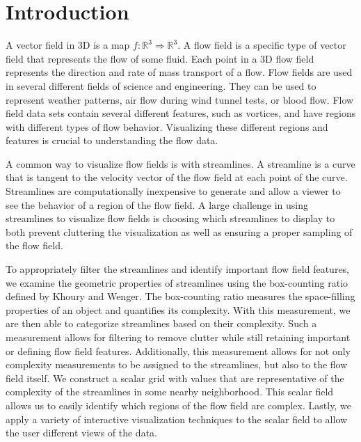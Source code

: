\documentclass{egpubl}
\newcommand {\emath}[1]  {\ensuremath{#1}}
\newcommand {\Real}[1]   {\emath{\mathbb{R}^{#1}}}   %
\newcommand {\Rthree}    {\Real{3}}                  %
\begin{document}

\section{Introduction}

A vector field in 3D is a map $f: \Rthree \Rightarrow \Rthree$.
A flow field is a specific type of vector field that represents the flow of some fluid.
Each point in a 3D flow field represents the direction and rate of mass transport of a flow.
Flow fields are used in several different fields of science and engineering.
They can be used to represent weather patterns, air flow during wind tunnel tests, or blood flow.
Flow field data sets contain several different features, such as vortices, and have regions with different types of flow behavior.
Visualizing these different regions and features is crucial to understanding the flow data.

A common way to visualize flow fields is with streamlines.
A streamline is a curve that is tangent to the velocity vector of the flow field at each point of the curve.
Streamlines are computationally inexpensive to generate and allow a viewer to see the behavior of a region of the flow field.
A large challenge in using streamlines to visualize flow fields is choosing which streamlines to display to both prevent cluttering the visualization as well as ensuring a proper sampling of the flow field.

To appropriately filter the streamlines and identify important flow field features, we examine the geometric properties of streamlines using the box-counting ratio defined by Khoury and Wenger.
The box-counting ratio measures the space-filling properties of an object and quantifies its complexity.
With this measurement, we are then able to categorize streamlines based on their complexity.
Such a measurement allows for filtering to remove clutter while still retaining important or defining flow field features.
Additionally, this measurement allows for not only complexity measurements to be assigned to the streamlines, but also to the flow field itself.
We construct a scalar grid with values that are representative of the complexity of the streamlines in some nearby neighborhood.
This scalar field allows us to easily identify which regions of the flow field are complex.
Lastly, we apply a variety of interactive visualization techniques to the scalar field to allow the user different views of the data.
\end{document}
